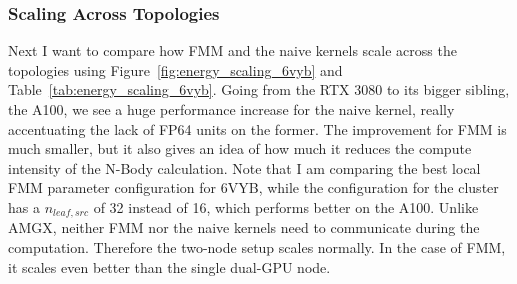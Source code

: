 %




\subsubsection{Scaling Across Topologies}

Next I want to compare how FMM and the naive kernels scale across the topologies using Figure~\ref{fig:energy_scaling_6vyb} and Table~\ref{tab:energy_scaling_6vyb}.
Going from the RTX 3080 to its bigger sibling, the A100, we see a huge performance increase for the naive kernel, really accentuating the lack of FP64 units on the former.
The improvement for FMM is much smaller, but it also gives an idea of how much it reduces the compute intensity of the N-Body calculation.
Note that I am comparing the best local FMM parameter configuration for 6VYB, while the configuration for the cluster has a $n_{leaf,src}$ of 32 instead of 16, which performs better on the A100.
Unlike AMGX, neither FMM nor the naive kernels need to communicate during the computation.
Therefore the two-node setup scales normally.
In the case of FMM, it scales even better than the single dual-GPU node.

%
%

